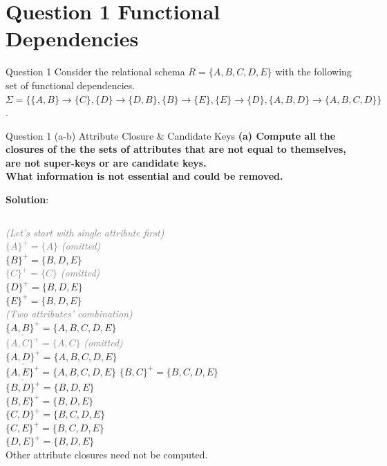 \section*{Question 1 Functional Dependencies}

\begin{frame}[fragile]{Question 1}
Consider the relational schema $R=\{A, B, C, D, E\}$ with the following set of functional dependencies.\\\vspace{5pt}
$\Sigma=\{\{A, B\} \rightarrow \{C\}, \{D\} \rightarrow \{D, B\}, \{B\} \rightarrow \{E\}, \{E\} \rightarrow \{D\}, \{A, B, D\} \rightarrow \{A, B, C, D\}\}$.
\end{frame}

\begin{frame}[fragile]{Question 1 (a-b) Attribute Closure \& Candidate Keys}
\textbf{(a) Compute all the closures of the the sets of attributes that are not equal to themselves, are not super-keys or are candidate keys.} \\
\textbf{What information is not essential and could be removed.}\vspace{15pt}

\textbf{Solution}: \vspace{3pt}

\begin{columns}[t]
	\textcolor{gray}{\scriptsize \textit{(Let's start with single attribute first)}}\\
	\textcolor{gray}{$\{A\}^{+}= \{A\}$ \scriptsize \textit{(omitted)}}\\	
	$\{B\}^{+}= \{B, D, E\}$\\	
	\textcolor{gray}{$\{C\}^{+}= \{C\}$ \scriptsize \textit{(omitted)}}\\
	$\{D\}^{+}= \{B, D, E\}$\\
	$\{E\}^{+}= \{B, D, E\}$\\ \vspace{5pt}
	\textcolor{gray}{\textit{\scriptsize (Two attributes' combination)}}\\
	$\underline{\{A, B\}^{+}}= \{A, B, C, D, E\}$\\
	\textcolor{gray}{$\{A, C\}^{+}= \{A, C\}$ \scriptsize \textit{(omitted)}}\\
	$\underline{\{A, D\}^{+}}= \{A, B, C, D, E\}$\\
	$\underline{\{A, E\}^{+}}= \{A, B, C, D, E\}$
	$\{B, C\}^{+}= \{B, C, D, E\}$\\
	$\{B, D\}^{+}= \{B, D, E\}$\\
	$\{B, E\}^{+}= \{B, D, E\}$\\
	$\{C, D\}^{+}= \{B, C, D, E\}$\\
	$\{C, E\}^{+}= \{B, C, D, E\}$\\
	$\{D, E\}^{+}= \{B, D, E\}$\\
	 \vspace{5pt}
	Other attribute closures need not be computed.
\end{columns}
\end{frame}

